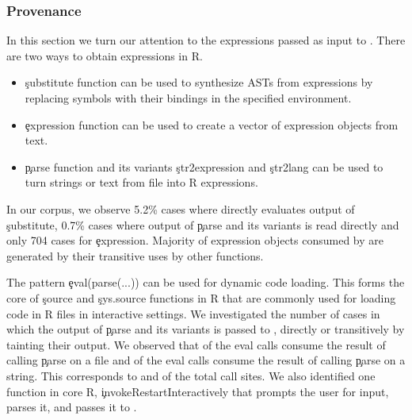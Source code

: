 \documentclass[conference]{IEEEtran}
\begin{document}
\subsubsection{Provenance}

In this section we turn our attention to the \AllExpressionInputEvalCallPerc
expressions passed as input to \eval. There are two ways to obtain
expressions in R.
\begin{itemize}
  \item \c{substitute} function can be used to synthesize ASTs from
  expressions by replacing symbols with their bindings in the specified
  environment.
  \item \c{expression} function can be used to create a vector of expression
    objects from text.
  \item \c{parse} function and its variants \c{str2expression} and \c{str2lang}
    can be used to turn strings or text from file into R expressions.
\end{itemize}

In our corpus, we observe 5.2\% cases where \eval directly evaluates output of
\c{substitute}, 0.7\% cases where output of \c{parse} and its variants is read
directly and only 704 cases for \c{expression}. Majority of expression objects
consumed by \eval are generated by their transitive uses by other functions.

The pattern \c{eval(parse(...))} can be used for dynamic code loading. This
forms the core of \c{source} and \c{sys.source} functions in R that are commonly
used for loading code in R files in interactive settings. We investigated the
number of cases in which the output of \c{parse} and its variants is passed to
\eval, directly or transitively by tainting their output. We observed that
\PercentParsedEvals of the eval calls consume the result of calling \c{parse} on
a file and \PasteParsedEvals of the eval calls consume the result of calling
\c{parse} on a string. This corresponds to \PercentParsedCallSites and
\PasteParsedCallSite of the total \eval call sites. We also identified one
function in core R, \c{invokeRestartInteractively} that prompts the user for
input, parses it, and passes it to \eval.
\end{document}
